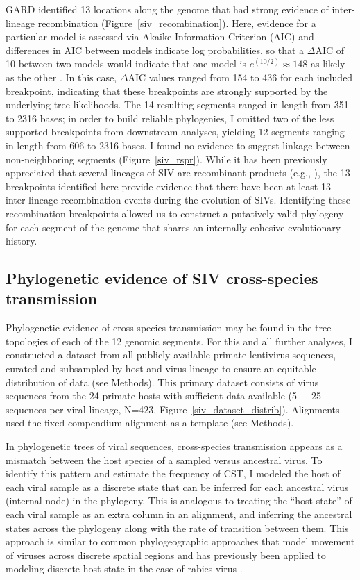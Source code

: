 GARD identified 13 locations along the genome that had strong evidence of inter-lineage recombination (Figure~\ref{siv_recombination}).
Here, evidence for a particular model is assessed via Akaike Information Criterion (AIC) and differences in AIC between models indicate log probabilities, so that a $\Delta$AIC of 10 between two models would indicate that one model is $e^{(10/2)} \approx 148$ as likely as the other \citep{akaike1992information}.
In this case, $\Delta$AIC values ranged from 154 to 436 for each included breakpoint, indicating that these breakpoints are strongly supported by the underlying tree likelihoods.
The 14 resulting segments ranged in length from 351 to 2316 bases; in order to build reliable phylogenies, I omitted two of the less supported breakpoints from downstream analyses, yielding 12 segments ranging in length from 606 to 2316 bases.
I found no evidence to suggest linkage between non-neighboring segments (Figure~\ref{siv_rspr}).
While it has been previously appreciated that several lineages of SIV are recombinant products (e.g., \citep{bailes2003hybrid,jin1994mosaic}), the 13 breakpoints identified here provide evidence that there have been at least 13 inter-lineage recombination events during the evolution of SIVs.
Identifying these recombination breakpoints allowed us to construct a putatively valid phylogeny for each segment of the genome that shares an internally cohesive evolutionary history.

\subsection{Phylogenetic evidence of SIV cross-species transmission}
Phylogenetic evidence of cross-species transmission may be found in the tree topologies of each of the 12 genomic segments.
For this and all further analyses, I constructed a dataset from all publicly available primate lentivirus sequences, curated and subsampled by host and virus lineage to ensure an equitable distribution of data (see Methods).
This primary dataset consists of virus sequences from the 24 primate hosts with sufficient data available (5 -– 25 sequences per viral lineage, N=423, Figure~\ref{siv_dataset_distrib}).
Alignments used the fixed compendium alignment as a template (see Methods).

In phylogenetic trees of viral sequences, cross-species transmission appears as a mismatch between the host species of a sampled versus ancestral virus.
To identify this pattern and estimate the frequency of CST, I modeled the host of each viral sample as a discrete state that can be inferred for each ancestral virus (internal node) in the phylogeny.
This is analogous to treating the “host state” of each viral sample as an extra column in an alignment, and inferring the ancestral states across the phylogeny along with the rate of transition between them.
This approach is similar to common phylogeographic approaches that model movement of viruses across discrete spatial regions \citep{volz2013viral} and has previously been applied to modeling discrete host state in the case of rabies virus \citep{faria2013simultaneously}.

